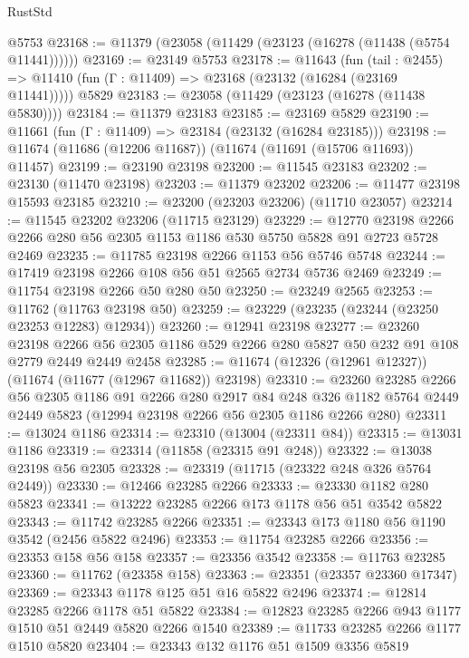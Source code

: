 \begin{lexlean}{RustStd}
\begin{coremodule}
    @5753
@23168 := @11379 (@23058 (@11429 (@23123 (@16278 (@11438 (@5754 @11441))))))
@23169 := @23149 @5753
@23178 := @11643
    (fun (tail : @2455) => @11410 (fun (Γ : @11409) => @23168 (@23132 (@16284 (@23169 @11441)))))
    @5829
@23183 := @23058 (@11429 (@23123 (@16278 (@11438 @5830))))
@23184 := @11379 @23183
@23185 := @23169 @5829
@23190 := @11661 (fun (Γ : @11409) => @23184 (@23132 (@16284 @23185)))
@23198 := @11674 (@11686 (@12206 @11687)) (@11674 (@11691 (@15706 @11693)) @11457)
@23199 := @23190 @23198
@23200 := @11545 @23183
@23202 := @23130 (@11470 @23198)
@23203 := @11379 @23202
@23206 := @11477 @23198 @15593 @23185
@23210 := @23200 (@23203 @23206) (@11710 @23057)
@23214 := @11545 @23202 @23206 (@11715 @23129)
@23229 := @12770
    @23198
    @2266
    @2266
    @280
    @56
    @2305
    @1153
    @1186
    @530
    @5750
    @5828
    @91
    @2723
    @5728
    @2469
@23235 := @11785 @23198 @2266 @1153 @56 @5746 @5748
@23244 := @17419 @23198 @2266 @108 @56 @51 @2565 @2734 @5736 @2469
@23249 := @11754 @23198 @2266 @50 @280 @50
@23250 := @23249 @2565
@23253 := @11762 (@11763 @23198 @50)
@23259 := @23229 (@23235 (@23244 (@23250 @23253 @12283) @12934))
@23260 := @12941 @23198
@23277 := @23260
    @23198
    @2266
    @56
    @2305
    @1186
    @529
    @2266
    @280
    @5827
    @50
    @232
    @91
    @108
    @2779
    @2449
    @2449
    @2458
@23285 := @11674 (@12326 (@12961 @12327)) (@11674 (@11677 (@12967 @11682)) @23198)
@23310 := @23260
    @23285
    @2266
    @56
    @2305
    @1186
    @91
    @2266
    @280
    @2917
    @84
    @248
    @326
    @1182
    @5764
    @2449
    @2449
    @5823
    (@12994 @23198 @2266 @56 @2305 @1186 @2266 @280)
@23311 := @13024 @1186
@23314 := @23310 (@13004 (@23311 @84))
@23315 := @13031 @1186
@23319 := @23314 (@11858 (@23315 @91 @248))
@23322 := @13038 @23198 @56 @2305
@23328 := @23319 (@11715 (@23322 @248 @326 @5764 @2449))
@23330 := @12466 @23285 @2266
@23333 := @23330 @1182 @280 @5823
@23341 := @13222 @23285 @2266 @173 @1178 @56 @51 @3542 @5822
@23343 := @11742 @23285 @2266
@23351 := @23343 @173 @1180 @56 @1190 @3542 (@2456 @5822 @2496)
@23353 := @11754 @23285 @2266
@23356 := @23353 @158 @56 @158
@23357 := @23356 @3542
@23358 := @11763 @23285
@23360 := @11762 (@23358 @158)
@23363 := @23351 (@23357 @23360 @17347)
@23369 := @23343 @1178 @125 @51 @16 @5822 @2496
@23374 := @12814 @23285 @2266 @1178 @51 @5822
@23384 := @12823 @23285 @2266 @943 @1177 @1510 @51 @2449 @5820 @2266 @1540
@23389 := @11733 @23285 @2266 @1177 @1510 @5820
@23404 := @23343
    @132
    @1176
    @51
    @1509
    @3356
    @5819

\end{coremodule}
\end{lexlean}
